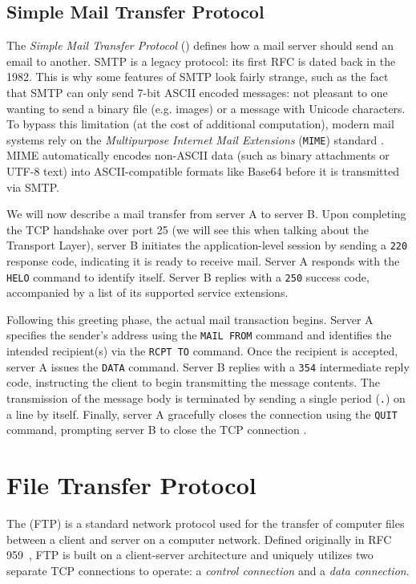 \subsection{Simple Mail Transfer Protocol}
The \emph{Simple Mail Transfer Protocol} () \cite{rfc5321} defines how a mail server should send an email to another.
SMTP is a legacy protocol: its first RFC is dated back in the 1982.
This is why some features of SMTP look fairly strange, such as the fact that SMTP can only send 7-bit ASCII encoded messages: not pleasant to one wanting to send a binary file (e.g. images) or a message with Unicode characters.
To bypass this limitation (at the cost of additional computation), modern mail systems rely on the \emph{Multipurpose Internet Mail Extensions} (\texttt{MIME}) standard \cite{rfc2045}. MIME automatically encodes non-ASCII data (such as binary attachments or UTF-8 text) into ASCII-compatible formats like Base64 before it is transmitted via SMTP.

We will now describe a mail transfer from server A to server B.
Upon completing the TCP handshake over port 25 (we will see this when talking about the Transport Layer), server B initiates the application-level session by sending a \texttt{220} response code, indicating it is ready to receive mail.
Server A responds with the \texttt{HELO} command to identify itself. Server B replies with a \texttt{250} success code, accompanied by a list of its supported service extensions. 

Following this greeting phase, the actual mail transaction begins. Server A specifies the sender's address using the \texttt{MAIL FROM} command and identifies the intended recipient(s) via the \texttt{RCPT TO} command. 
Once the recipient is accepted, server A issues the \texttt{DATA} command. 
Server B replies with a \texttt{354} intermediate reply code, instructing the client to begin transmitting the message contents. 
The transmission of the message body is terminated by sending a single period (\texttt{.}) on a line by itself. 
Finally, server A gracefully closes the connection using the \texttt{QUIT} command, prompting server B to close the TCP connection \cite{kurose2017}.

\section{File Transfer Protocol}
The  (FTP) is a standard network protocol used for the transfer of computer files between a client and server on a computer network. Defined originally in RFC 959~\cite{rfc959}, FTP is built on a client-server architecture and uniquely utilizes two separate TCP connections to operate: a \emph{control connection} and a \emph{data connection}.

